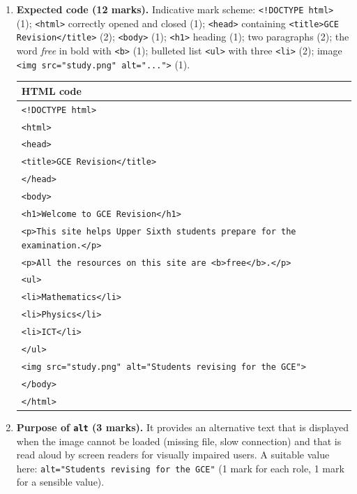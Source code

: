 \documentclass[11pt]{article}
\begin{document}
\begin{corrige}
\begin{enumerate}
\item \textbf{Expected code (12 marks).} Indicative mark scheme: \texttt{<!DOCTYPE html>} (1); \texttt{<html>} correctly opened and closed (1); \texttt{<head>} containing \texttt{<title>GCE Revision</title>} (2); \texttt{<body>} (1); \texttt{<h1>} heading (1); two paragraphs (2); the word \emph{free} in bold with \texttt{<b>} (1); bulleted list \texttt{<ul>} with three \texttt{<li>} (2); image \texttt{<img src="study.png" alt="...">} (1).
\begin{center}
\begin{tabular}{|l|}
\hline
\rowcolor{popblueL} \textbf{HTML code} \\
\hline
\texttt{<!DOCTYPE html>} \\
\texttt{<html>} \\
\texttt{<head>} \\
\texttt{<title>GCE Revision</title>} \\
\texttt{</head>} \\
\texttt{<body>} \\
\texttt{<h1>Welcome to GCE Revision</h1>} \\
\texttt{<p>This site helps Upper Sixth students prepare for the examination.</p>} \\
\texttt{<p>All the resources on this site are <b>free</b>.</p>} \\
\texttt{<ul>} \\
\texttt{<li>Mathematics</li>} \\
\texttt{<li>Physics</li>} \\
\texttt{<li>ICT</li>} \\
\texttt{</ul>} \\
\texttt{<img src="study.png" alt="Students revising for the GCE">} \\
\texttt{</body>} \\
\texttt{</html>} \\
\hline
\end{tabular}
\end{center}
\item \textbf{Purpose of \texttt{alt} (3 marks).} It provides an alternative text that is displayed when the image cannot be loaded (missing file, slow connection) and that is read aloud by screen readers for visually impaired users. A suitable value here: \texttt{alt="Students revising for the GCE"} (1 mark for each role, 1 mark for a sensible value).

\end{enumerate}
\end{corrige}
\end{document}

